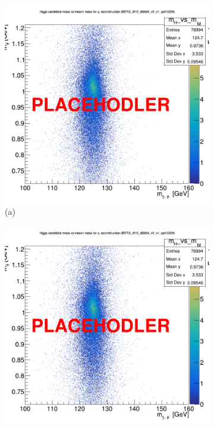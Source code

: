 \begin{figure}[!ht]
    \captionsetup[subfigure]{labelformat=empty}
    \vspace*{-0.2cm}
    \centering
    \setlength{\mylength}{\textwidth}
    \begin{subfigure}[t]{0.50\mylength}
        \centering
        \includegraphics[width=0.45\mylength]{resources/plots/PLACEHOLDER.png}
        \caption{\footnotesize (a)}
    \end{subfigure}%
    \begin{subfigure}[t]{0.50\mylength}
        \centering
        \includegraphics[width=0.45\mylength]{resources/plots/PLACEHOLDER.png}

\end{subfigure}
\end{figure}
